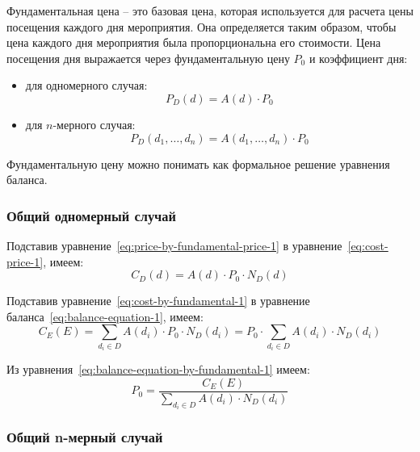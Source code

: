 Фундаментальная цена -- это базовая цена, которая используется для расчета цены посещения каждого дня мероприятия. Она определяется таким образом, чтобы цена каждого дня мероприятия была пропорциональна его стоимости. Цена посещения дня выражается через фундаментальную цену $P_0$ и коэффициент дня:
\begin{itemize}[label=--]
	\item для одномерного случая:
	\begin{equation}
		P_D(d) = A(d) \cdot P_0
		\label{eq:price-by-fundamental-price-1}
	\end{equation}
	\item для $n$-мерного случая:
	\begin{equation}
		P_D(d_1, \dots, d_n) = A(d_1, \dots, d_n) \cdot P_0
		\label{eq:price-by-fundamental-price-2}
	\end{equation}
\end{itemize}  

Фундаментальную цену можно понимать как формальное решение уравнения баланса.

\subsubsection{Общий одномерный случай}

Подставив уравнение~\ref{eq:price-by-fundamental-price-1} в уравнение~\ref{eq:cost-price-1}, имеем:
\begin{equation}
	C_D(d) = A(d) \cdot P_0 \cdot N_D(d)
	\label{eq:cost-by-fundamental-1}
\end{equation}

Подставив уравнение~\ref{eq:cost-by-fundamental-1} в уравнение баланса~\ref{eq:balance-equation-1}, имеем:
\begin{equation}
	C_E(E) = \sum_{d_i \in D}{A(d_i) \cdot P_0 \cdot N_D(d_i)} = P_0 \cdot \sum_{d_i \in D}{A(d_i) \cdot N_D(d_i)}
	\label{eq:balance-equation-by-fundamental-1}
\end{equation}

Из уравнения~\ref{eq:balance-equation-by-fundamental-1} имеем:
\begin{equation}
	P_0 = \frac{C_E(E)}{\sum_{d_i \in D}{A(d_i) \cdot N_D(d_i)}}
	\label{eq:fundamental-price-1}
\end{equation}

\subsubsection{Общий n-мерный случай}

